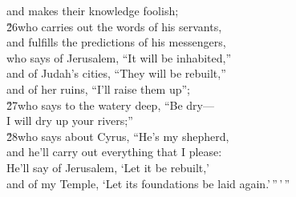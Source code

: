 \begin{poetry}
\poemll    and makes their knowledge foolish; \\
\poeml \v{26}who carries out the words of his servants, \\
\poemll    and fulfills the predictions of his messengers, \\
\poeml who says of Jerusalem, ``It will be inhabited,'' \\
\poemll    and of Judah's cities, ``They will be rebuilt,'' \\
\poeml and of her ruins, ``I'll raise them up''; \\
\poeml \v{27}who says to the watery deep, ``Be dry--- \\
\poemll    I will dry up your rivers;'' \\
\poeml \v{28}who says about Cyrus, ``He's my shepherd, \\
\poemll    and he'll carry out everything that I please: \\
\poeml He'll say of Jerusalem, `Let it be rebuilt,' \\
\poemll    and of my Temple, `Let its foundations be laid again.'\,''\,'\,''
\end{poetry}

